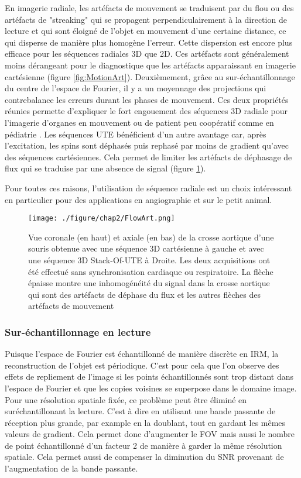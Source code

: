 En imagerie radiale, les artéfacts de mouvement se traduisent par du flou ou des artéfacts de "streaking" qui se propagent perpendiculairement à la direction de lecture et qui sont éloigné de l'objet en mouvement d'une certaine distance, ce qui disperse de manière plus homogène l'erreur. Cette dispersion est encore plus efficace pour les séquences radiales 3D que 2D. Ces artéfacts sont généralement moins dérangeant pour le diagnostique que les artéfacts apparaissant en imagerie cartésienne (figure \ref{fig:MotionArt}).
Deuxièmement, grâce au sur-échantillonnage du centre de l'espace de Fourier, il y a un moyennage des projections qui contrebalance les erreurs durant les phases de mouvement.
Ces deux propriétés réunies permette d'expliquer le fort engouement des séquences 3D radiale pour l'imagerie d'organes en mouvement ou de patient peu coopératif comme en pédiatrie \cite{block2014towards,Nayak:2014aa}.
Les séquences UTE bénéficient d'un autre avantage car, après l'excitation, les spins sont déphasés puis rephasé par moins de gradient qu'avec des séquences cartésiennes. Cela permet de limiter les artéfacts de déphasage de flux qui se traduise par une absence de signal (figure \ref{fig:FluxArt}).

Pour toutes ces raisons, l'utilisation de séquence radiale est un choix intéressant en particulier pour des applications en angiographie et sur le petit animal. 
\begin{figure}[H]
\centering
\texttt{[image: ./figure/chap2/FlowArt.png]}
\caption[Artéfact de flux]{\label{fig:FluxArt} Vue coronale (en haut) et axiale (en bas) de la crosse aortique d'une souris obtenue avec une séquence 3D cartésienne à gauche et avec une séquence 3D Stack-Of-UTE à Droite. Les deux acquisitions ont été effectué sans synchronisation cardiaque ou respiratoire. La flèche épaisse montre une inhomogénéité du signal dans la crosse aortique qui sont des artéfacts de déphase du flux et les autres flèches  des artéfacts de mouvement}
\end{figure}

\subsubsection{Sur-échantillonnage en lecture}

Puisque l'espace de Fourier est échantillonné de manière discrète en IRM, la reconstruction de l'objet est périodique. C'est pour cela que l'on observe des effets de repliement de l'image si les points échantillonnés sont trop distant dans l'espace de Fourier et que les copies voisines se superpose dans le domaine image. Pour une résolution spatiale fixée, ce problème peut être éliminé en suréchantillonant la lecture. C'est à dire en utilisant une bande passante de réception plus grande, par example en la doublant, tout en gardant les mêmes valeurs de gradient. Cela permet donc d'augmenter le FOV mais aussi le nombre de point échantillonné d'un facteur 2 de manière à garder la même résolution spatiale. Cela permet aussi de compenser la diminution du SNR provenant de l'augmentation de la bande passante.

